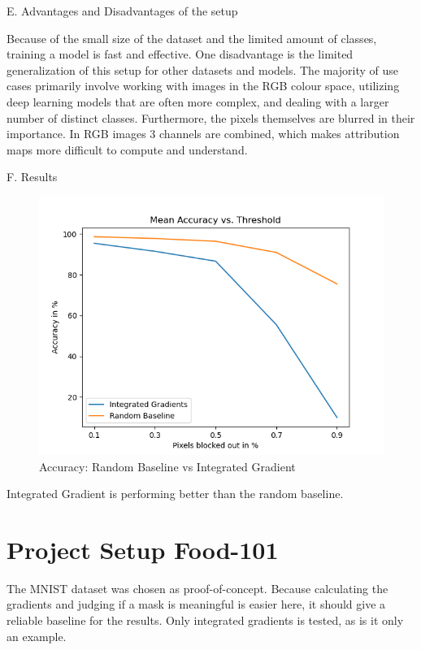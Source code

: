E. Advantages and Disadvantages of the setup

Because of the small size of the dataset and the limited amount of classes, training a model is fast and effective. One disadvantage is the limited generalization of this setup for other datasets and models. The majority of use cases primarily involve working with images in the RGB colour space, utilizing deep learning models that are often more complex, and dealing with a larger number of distinct classes. Furthermore, the pixels themselves are blurred in their importance. In RGB images 3 channels are combined, which makes attribution maps more difficult to compute and understand.

F. Results

\begin{figure}[h!]
	\centering
	\includegraphics[width=150mm]{figs/mean_accuracy_vs_threshold}
	\caption{Accuracy: Random Baseline vs Integrated Gradient}
	\label{fig:Accuracy}
	
\end{figure}

Integrated Gradient is performing better than the random baseline.


\section{Project Setup Food-101}

The MNIST dataset \cite{deng2012mnist} was chosen as proof-of-concept. Because calculating the gradients and judging if a mask is meaningful is easier here, it should give a reliable baseline for the results. Only integrated gradients is tested, as is it only an example. 

